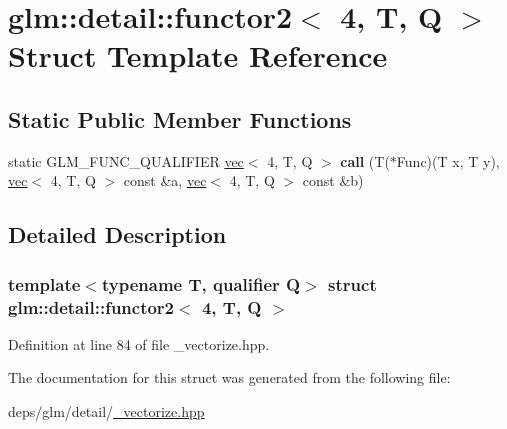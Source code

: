 \hypertarget{structglm_1_1detail_1_1functor2_3_014_00_01T_00_01Q_01_4}{}\section{glm\+:\+:detail\+:\+:functor2$<$ 4, T, Q $>$ Struct Template Reference}
\label{structglm_1_1detail_1_1functor2_3_014_00_01T_00_01Q_01_4}
\subsection*{Static Public Member Functions}
\begin{DoxyCompactItemize}
\item 
\mbox{\label{structglm_1_1detail_1_1functor2_3_014_00_01T_00_01Q_01_4_aaf4c70145020e3cbfdc975eee7f9a9cd}} 
static G\+L\+M\+\_\+\+F\+U\+N\+C\+\_\+\+Q\+U\+A\+L\+I\+F\+I\+ER \hyperlink{structglm_1_1vec}{vec}$<$ 4, T, Q $>$ {\bfseries call} (T($\ast$Func)(T x, T y), \hyperlink{structglm_1_1vec}{vec}$<$ 4, T, Q $>$ const \&a, \hyperlink{structglm_1_1vec}{vec}$<$ 4, T, Q $>$ const \&b)
\end{DoxyCompactItemize}


\subsection{Detailed Description}
\subsubsection*{template$<$typename T, qualifier Q$>$\newline
struct glm\+::detail\+::functor2$<$ 4, T, Q $>$}



Definition at line 84 of file \+\_\+vectorize.\+hpp.



The documentation for this struct was generated from the following file\+:\begin{DoxyCompactItemize}
\item 
deps/glm/detail/\hyperlink{__vectorize_8hpp}{\+\_\+vectorize.\+hpp}\end{DoxyCompactItemize}
